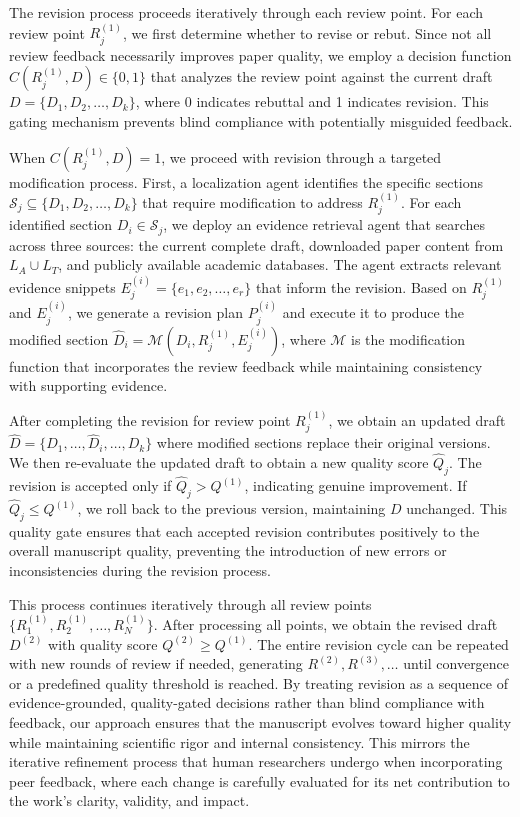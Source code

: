 \documentclass[manuscript,review,anonymous]{acmart}
\begin{document}
The revision process proceeds iteratively through each review point. For each review point $R_j^{(1)}$, we first determine whether to revise or rebut. Since not all review feedback necessarily improves paper quality, we employ a decision function $C(R_j^{(1)}, D) \in \{0, 1\}$ that analyzes the review point against the current draft $D = \{D_1, D_2, \ldots, D_k\}$, where 0 indicates rebuttal and 1 indicates revision. This gating mechanism prevents blind compliance with potentially misguided feedback.

When $C(R_j^{(1)}, D) = 1$, we proceed with revision through a targeted modification process. First, a localization agent identifies the specific sections $\mathcal{S}_j \subseteq \{D_1, D_2, \ldots, D_k\}$ that require modification to address $R_j^{(1)}$. For each identified section $D_i \in \mathcal{S}_j$, we deploy an evidence retrieval agent that searches across three sources: the current complete draft, downloaded paper content from $L_A \cup L_T$, and publicly available academic databases. The agent extracts relevant evidence snippets $E_j^{(i)} = \{e_1, e_2, \ldots, e_r\}$ that inform the revision. Based on $R_j^{(1)}$ and $E_j^{(i)}$, we generate a revision plan $P_j^{(i)}$ and execute it to produce the modified section $\hat{D}_i = \mathcal{M}(D_i, R_j^{(1)}, E_j^{(i)})$, where $\mathcal{M}$ is the modification function that incorporates the review feedback while maintaining consistency with supporting evidence.

After completing the revision for review point $R_j^{(1)}$, we obtain an updated draft $\hat{D} = \{D_1, \ldots, \hat{D}_i, \ldots, D_k\}$ where modified sections replace their original versions. We then re-evaluate the updated draft to obtain a new quality score $\hat{Q}_j$. The revision is accepted only if $\hat{Q}_j > Q^{(1)}$, indicating genuine improvement. If $\hat{Q}_j \leq Q^{(1)}$, we roll back to the previous version, maintaining $D$ unchanged. This quality gate ensures that each accepted revision contributes positively to the overall manuscript quality, preventing the introduction of new errors or inconsistencies during the revision process.

This process continues iteratively through all review points $\{R_1^{(1)}, R_2^{(1)}, \ldots, R_N^{(1)}\}$. After processing all points, we obtain the revised draft $D^{(2)}$ with quality score $Q^{(2)} \geq Q^{(1)}$. The entire revision cycle can be repeated with new rounds of review if needed, generating $R^{(2)}, R^{(3)}, \ldots$ until convergence or a predefined quality threshold is reached. By treating revision as a sequence of evidence-grounded, quality-gated decisions rather than blind compliance with feedback, our approach ensures that the manuscript evolves toward higher quality while maintaining scientific rigor and internal consistency. This mirrors the iterative refinement process that human researchers undergo when incorporating peer feedback, where each change is carefully evaluated for its net contribution to the work's clarity, validity, and impact.
\end{document}
